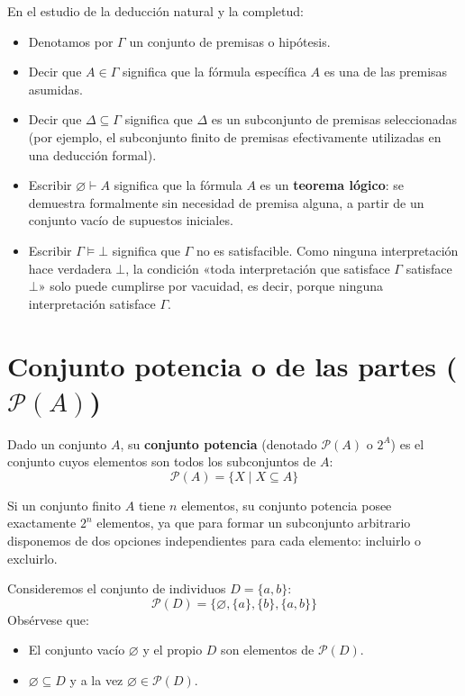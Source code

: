 \begin{ejemplo}
En el estudio de la deducción natural y la completud:
\begin{itemize}
    \item Denotamos por $\Gamma$ un conjunto de premisas o hipótesis.
    \item Decir que $A \in \Gamma$ significa que la fórmula específica $A$ es una de las premisas asumidas.
    \item Decir que $\Delta \subseteq \Gamma$ significa que $\Delta$ es un subconjunto de premisas seleccionadas (por ejemplo, el subconjunto finito de premisas efectivamente utilizadas en una deducción formal).
    \item Escribir $\varnothing \vdash A$ significa que la fórmula $A$
      es un \textbf{teorema lógico}: se demuestra formalmente sin
      necesidad de premisa alguna, a partir de un conjunto vacío de
      supuestos iniciales.
    \item Escribir $\Gamma \models \bot$ significa que $\Gamma$ no es
      satisfacible. Como ninguna interpretación hace verdadera $\bot$,
      la condición «toda interpretación que satisface $\Gamma$
      satisface $\bot$» solo puede cumplirse por vacuidad, es decir, porque
      ninguna interpretación satisface $\Gamma$.
\end{itemize}
\end{ejemplo}

\section{Conjunto potencia o de las partes (\texorpdfstring{$\mathcal{P}(A)$}{P(A)})}

\begin{definicion}
Dado un conjunto $A$, su \textbf{conjunto potencia} (denotado $\mathcal{P}(A)$ o $2^A$) es el conjunto cuyos elementos son todos los subconjuntos de $A$:
\[
\mathcal{P}(A) = \{X \mid X \subseteq A\}
\]
\end{definicion}

Si un conjunto finito $A$ tiene $n$ elementos, su conjunto potencia posee exactamente $2^n$ elementos, ya que para formar un subconjunto arbitrario disponemos de dos opciones independientes para cada elemento: incluirlo o excluirlo.

\begin{ejemplo}
Consideremos el conjunto de individuos $D = \{a, b\}$:
\[
\mathcal{P}(D) = \{\varnothing, \{a\}, \{b\}, \{a, b\}\}
\]
Obsérvese que:
\begin{itemize}
    \item El conjunto vacío $\varnothing$ y el propio $D$ son elementos de $\mathcal{P}(D)$.
    \item $\varnothing \subseteq D$ y a la vez $\varnothing \in \mathcal{P}(D)$.
\end{itemize}
\end{ejemplo}

